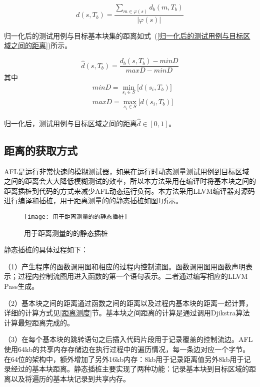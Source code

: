 \begin{equation}\label{测试用例与目标区域之间的距离}
d(s,T_b) = \frac{\sum_{m \in \varphi(s)} d_{b}(m,T_b) }{|\varphi(s)|}
\end{equation}

归一化后的测试用例与目标基本块集的距离如式~(\ref{归一化后的测试用例与目标区域之间的距离})所示。

\begin{equation}\label{归一化后的测试用例与目标区域之间的距离}
\hat{d}(s,T_b) = \frac{d_{b}(s,T_b)-minD }{maxD-minD}
\end{equation}
其中
\begin{equation}\label{minD和maxD的定义}
\begin{aligned}
& minD = \min\limits_{s_{i} \in S}\lbrack d(s_{i}, T_b) \rbrack \\
& maxD = \max\limits_{s_{i} \in S}\lbrack d(s_{i}, T_b) \rbrack
\end{aligned}
\end{equation}

归一化后，测试用例与目标区域之间的距离$\hat{d} \in [0,1]$。

\subsection{距离的获取方式}
AFL是运行非常快速的模糊测试器，如果在运行时动态测量测试用例到目标区域之间的距离会大大降低模糊测试的效率，所以本方法采用在编译时将基本块之间的距离插桩到代码的方式来减少AFL动态运行负荷。本方法采用LLVM编译器对源码进行编译和插桩，用于距离测量的的静态插桩如图\ref{用于距离测量的的静态插桩}所示。

\begin{figure}[htb]
\begin{center}
\texttt{[image: 用于距离测量的的静态插桩]}
\end{center}
\caption{用于距离测量的的静态插桩}
\label{用于距离测量的的静态插桩}
\end{figure}

静态插桩的具体过程如下：

（1）产生程序的函数调用图和相应的过程内控制流图。函数调用图用函数声明表示；过程内控制流图用进入函数的第一个语句表示。二者通过编写相应的LLVM Pass生成。

（2）基本块之间的距离通过函数之间的距离以及过程内基本块的距离一起计算，详细的计算方式见\ref{距离测度}节。基本块之间距离的计算是通过调用Djikstra算法计算最短距离完成的。

（3）在每个基本块的跳转语句之后插入代码片段用于记录覆盖的控制流边。AFL使用64kb的共享内存存储边在执行过程中的遍历情况，每一条边对应一个字节。在64位的架构中，额外增加了另外16kb内存：8kb用于记录距离值另外8kb用于记录经过的基本块距离。静态插桩主要实现了两种功能：记录基本块到目标区域的距离以及将遍历的基本块记录到共享内存。

